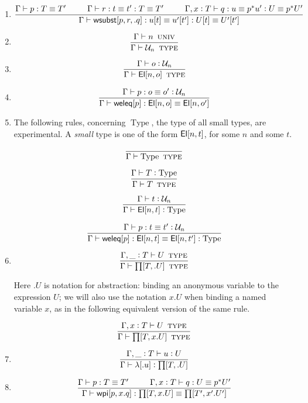 \documentclass[11pt]{article}
\newcommand{\eqd}{\equiv}
\newcommand{\Eu}{{\cal U}}
\newcommand\spc{{\hskip 26pt}}
\newcommand{\ccolon}{\vcentcolon}
\newcommand{\ccheck}{\vcentcolon}            %
\newcommand{\csynth}{\vcentcolon\vcentcolon} %
\renewcommand{\csynth}{\ccheck}              %
\newcommand{\Univ}{\mathop{\text{ \sc univ}}}
\newcommand{\TYPE}{\mathop{\text{ \sc type}}}
\newcommand{\Type}{\mathop{\text{Type}}}
\newcommand{\ha}[2]{#1[#2]}
\newcommand{\El}{{\sf El}}
\newcommand{\weleq}{{\sf weleq}}
\newcommand{\wsubst}{{\sf wsubst}}
\newcommand{\wpieq}{{\sf wpi}}
\newcommand{\var}{\char`_}
\begin{document}
\begin{enumerate}
\item 
\[ \frac{ 
  \Gamma \vdash p:T \eqd T'  
  \spc
  \Gamma \vdash r:t \eqd t' : T \eqd T'  
  \spc
  \Gamma,  x \ccolon T \vdash q:u \eqd p^* u' \ccolon U \eqd p^*U'
  } {
  \Gamma \vdash \ha\wsubst{p,r,.q} : u[t] \eqd u'[t'] : U[t] \eqd U'[t']
}\]

\item

\[\frac{\Gamma \vdash n \Univ  }
       {\Gamma \vdash \Eu_n \TYPE  }\]

\item

\[\frac{
  \Gamma \vdash o \csynth{\Eu_n}}{
  \Gamma \vdash \ha\El{n,o}\TYPE }\]

\item 

\[\frac{\Gamma \vdash p : o \eqd o' \ccheck \Eu_n}
       {\Gamma \vdash \ha\weleq{p} : \ha\El{n,o} \eqd \ha\El{n,o'}}\]

\item
The following rules, concerning $\Type$, the type of all small types, are
experimental.  A {\em small} type is one of the form $\ha\El{n,t}$, for some
$n$ and some $t$.

\[\frac{}
       {\Gamma \vdash \Type \TYPE }\]

\[\frac{\Gamma \vdash T \ccolon \Type}
       {\Gamma \vdash T \TYPE}\]

\[\frac{\Gamma \vdash t \ccolon \Eu_n}
       {\Gamma \vdash \ha\El{n,t} \ccheck \Type}\]

\[\frac{\Gamma \vdash p : t \eqd t' \ccheck \Eu_n}
       {\Gamma \vdash \ha\weleq{p} : \ha\El{n,t} \eqd \ha\El{n,t'} : \Type }\]

\item 
\[\frac{ \Gamma, \var \ccolon T \vdash U\TYPE  }{\Gamma \vdash \ha\prod{T,.U}\TYPE}\]

Here $.U$ is notation for abstraction: binding an anonymous variable to the
expression $U$; we will also use the notation $x.U$ when binding a named
variable $x$, as in the following equivalent version of the same rule.

\[\frac{ \Gamma, x \ccolon T \vdash U\TYPE  }
       {\Gamma \vdash \ha\prod{T,x.U}\TYPE}\]

\item 
\[\frac{
  \Gamma, \var \ccolon T \vdash u \ccheck{U}
}{\Gamma \vdash \ha\lambda{.u} \ccheck{\ha\prod{T,.U}}}
\]

\item 
\[ \frac{ 
  \Gamma \vdash p:T \eqd T'  \spc
  \Gamma,  x \ccolon T \vdash q:U \eqd p^*U' 
  } {
  \Gamma \vdash \ha\wpieq{p,x.q}:\ha\prod{T,x.U}\eqd \ha\prod{T',x'.U'}
}\]


\end{enumerate}
\end{document}

